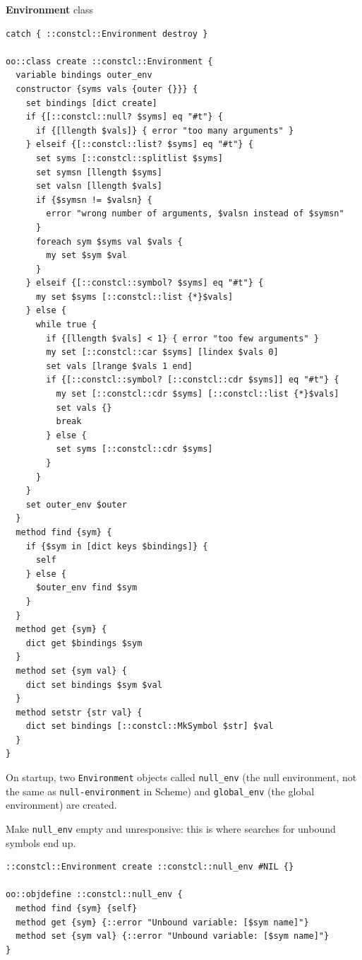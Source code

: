 \documentclass[twoside,9pt]{report}
\begin{document}
\textbf{Environment} class

\noindent\makebox[\linewidth]{\rule{\linewidth}{0.4pt}}
\begin{lstlisting}
catch { ::constcl::Environment destroy }
 
oo::class create ::constcl::Environment {
  variable bindings outer_env
  constructor {syms vals {outer {}}} {
    set bindings [dict create]
    if {[::constcl::null? $syms] eq "#t"} {
      if {[llength $vals]} { error "too many arguments" }
    } elseif {[::constcl::list? $syms] eq "#t"} {
      set syms [::constcl::splitlist $syms]
      set symsn [llength $syms]
      set valsn [llength $vals]
      if {$symsn != $valsn} {
        error "wrong number of arguments, $valsn instead of $symsn"
      }
      foreach sym $syms val $vals {
        my set $sym $val
      }
    } elseif {[::constcl::symbol? $syms] eq "#t"} {
      my set $syms [::constcl::list {*}$vals]
    } else {
      while true {
        if {[llength $vals] < 1} { error "too few arguments" }
        my set [::constcl::car $syms] [lindex $vals 0]
        set vals [lrange $vals 1 end]
        if {[::constcl::symbol? [::constcl::cdr $syms]] eq "#t"} {
          my set [::constcl::cdr $syms] [::constcl::list {*}$vals]
          set vals {}
          break
        } else {
          set syms [::constcl::cdr $syms]
        }
      }
    }
    set outer_env $outer
  }
  method find {sym} {
    if {$sym in [dict keys $bindings]} {
      self
    } else {
      $outer_env find $sym
    }
  }
  method get {sym} {
    dict get $bindings $sym
  }
  method set {sym val} {
    dict set bindings $sym $val
  }
  method setstr {str val} {
    dict set bindings [::constcl::MkSymbol $str] $val
  }
}
\end{lstlisting}
\noindent\makebox[\linewidth]{\rule{\linewidth}{0.4pt}}

On startup, two \texttt{Environment} objects called \texttt{null\_env} (the null environment, not the same as \texttt{null-environment} in Scheme) and \texttt{global\_env} (the global environment) are created.


Make \texttt{null\_env} empty and unresponsive: this is where searches for unbound symbols end up.

\noindent\makebox[\linewidth]{\rule{\linewidth}{0.4pt}}
\begin{lstlisting}
::constcl::Environment create ::constcl::null_env #NIL {}
 
oo::objdefine ::constcl::null_env {
  method find {sym} {self}
  method get {sym} {::error "Unbound variable: [$sym name]"}
  method set {sym val} {::error "Unbound variable: [$sym name]"}
}
\end{lstlisting}
\noindent\makebox[\linewidth]{\rule{\linewidth}{0.4pt}}
\end{document}

